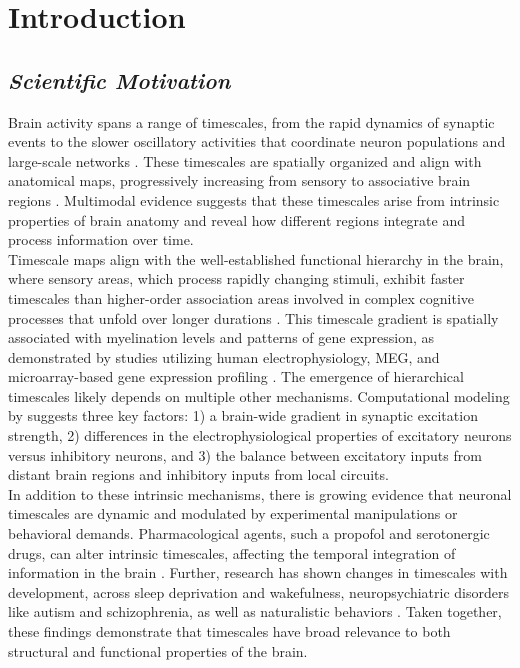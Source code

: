 \documentclass[latex/main.tex]{subfiles}
\begin{document}
\section{Introduction}

\subsection{\textit{Scientific Motivation}} 
Brain activity spans a range of timescales, from the rapid dynamics of synaptic events to the slower oscillatory activities that coordinate neuron populations and large-scale networks \citep{buzsaki_large-scale_2004}. These timescales are spatially organized and align with anatomical maps, progressively increasing from sensory to associative brain regions \citep{raut_hierarchical_2020, gao_neuronal_2020, hasson_hierarchy_2008}. Multimodal evidence suggests that these timescales arise from intrinsic properties of brain anatomy and reveal how different regions integrate and process information over time.\\

Timescale maps align with the well-established functional hierarchy in the brain, where sensory areas, which process rapidly changing stimuli, exhibit faster timescales than higher-order association areas involved in complex cognitive processes that unfold over longer durations \citep{murray_hierarchy_2014, hasson_hierarchy_2008, stephens_place_2013}. This timescale gradient is spatially associated with myelination levels and patterns of gene expression, as demonstrated by studies utilizing human electrophysiology, MEG, and microarray-based gene expression profiling \citep{gao_neuronal_2020, shafiei_neurophysiological_2023}. The emergence of hierarchical timescales likely depends on multiple other mechanisms. Computational modeling by \citet{li_hierarchical_2022} suggests three key factors: 1) a brain-wide gradient in synaptic excitation strength, 2) differences in the electrophysiological properties of excitatory neurons versus inhibitory neurons, and 3) the balance between excitatory inputs from distant brain regions and inhibitory inputs from local circuits.\\

In addition to these intrinsic mechanisms, there is growing evidence that neuronal timescales are dynamic and modulated by experimental manipulations or behavioral demands. Pharmacological agents, such a propofol and serotonergic drugs, can alter intrinsic timescales, affecting the temporal integration of information in the brain \citep{huang_timescales_2018, shinn_functional_2023}. Further, research has shown changes in timescales with development, across sleep deprivation and wakefulness, neuropsychiatric disorders like autism and schizophrenia, as well as naturalistic behaviors \citep{martin-burgos_development_2024, meisel_decline_2017, watanabe_atypical_2019, wengler_distinct_2020, manea_neural_2024}. Taken together, these findings demonstrate that timescales have broad relevance to both structural and functional properties of the brain.\\
\end{document}
